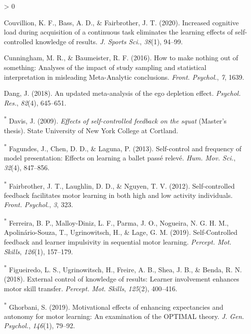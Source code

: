 \documentclass[
  english,
  man,floatsintext]{apa7}
\newlength{\cslhangindent}
\newenvironment{CSLReferences}[2] %
 {%
  \setlength{\parindent}{0pt}
  \ifodd #1 \everypar{\setlength{\hangindent}{\cslhangindent}}\ignorespaces\fi
  \ifnum #2 > 0
  \setlength{\parskip}{#2\baselineskip}
  \fi
 }%
 {}
\begin{document}
\begin{CSLReferences}{1}{0}
\leavevmode\hypertarget{ref-Couvillion2020-zw}{}%
Couvillion, K. F., Bass, A. D., \& Fairbrother, J. T. (2020). Increased cognitive load during acquisition of a continuous task eliminates the learning effects of self-controlled knowledge of results. \emph{J. Sports Sci.}, \emph{38}(1), 94--99.

\leavevmode\hypertarget{ref-Cunningham2016-qy}{}%
Cunningham, M. R., \& Baumeister, R. F. (2016). How to make nothing out of something: Analyses of the impact of study sampling and statistical interpretation in misleading {Meta-Analytic} conclusions. \emph{Front. Psychol.}, \emph{7}, 1639.

\leavevmode\hypertarget{ref-Dang2018-xa}{}%
Dang, J. (2018). An updated meta-analysis of the ego depletion effect. \emph{Psychol. Res.}, \emph{82}(4), 645--651.

\leavevmode\hypertarget{ref-davis2009-dt}{}%
\textsuperscript{*} Davis, J. (2009). \emph{Effects of self-controlled feedback on the squat} (Master's thesis). State University of New York College at Cortland.

\leavevmode\hypertarget{ref-Fagundes2013-ge}{}%
\textsuperscript{*} Fagundes, J., Chen, D. D., \& Laguna, P. (2013). Self-control and frequency of model presentation: Effects on learning a ballet pass{é} relev{é}. \emph{Hum. Mov. Sci.}, \emph{32}(4), 847--856.

\leavevmode\hypertarget{ref-Fairbrother2012-gz}{}%
\textsuperscript{*} Fairbrother, J. T., Laughlin, D. D., \& Nguyen, T. V. (2012). Self-controlled feedback facilitates motor learning in both high and low activity individuals. \emph{Front. Psychol.}, \emph{3}, 323.

\leavevmode\hypertarget{ref-Ferreira2019-zo}{}%
\textsuperscript{*} Ferreira, B. P., Malloy-Diniz, L. F., Parma, J. O., Nogueira, N. G. H. M., Apolinário-Souza, T., Ugrinowitsch, H., \& Lage, G. M. (2019). {Self-Controlled} feedback and learner impulsivity in sequential motor learning. \emph{Percept. Mot. Skills}, \emph{126}(1), 157--179.

\leavevmode\hypertarget{ref-Figueiredo2018-kw}{}%
\textsuperscript{*} Figueiredo, L. S., Ugrinowitsch, H., Freire, A. B., Shea, J. B., \& Benda, R. N. (2018). External control of knowledge of results: Learner involvement enhances motor skill transfer. \emph{Percept. Mot. Skills}, \emph{125}(2), 400--416.

\leavevmode\hypertarget{ref-Ghorbani2019-yz}{}%
\textsuperscript{*} Ghorbani, S. (2019). Motivational effects of enhancing expectancies and autonomy for motor learning: An examination of the {OPTIMAL} theory. \emph{J. Gen. Psychol.}, \emph{146}(1), 79--92.


\end{CSLReferences}
\end{document}
